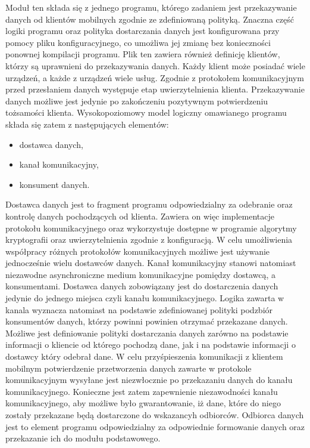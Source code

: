 Moduł ten składa się z jednego programu, którego zadaniem jest
przekazywanie danych od klientów mobilnych zgodnie ze zdefiniowaną
polityką. Znaczna część logiki programu oraz polityka dostarczania
danych jest konfigurowana przy pomocy pliku konfiguracyjnego, co
umożliwa jej zmianę bez konieczności ponownej kompilacji
programu. Plik ten zawiera również definicję klientów, którzy są
uprawnieni do przekazywania danych. Każdy klient może posiadać wiele
urządzeń, a każde z urządzeń wiele usług. Zgodnie z protokołem
komunikacyjnym przed przesłaniem danych występuje etap
uwierzytelnienia klienta. Przekazywanie danych możliwe jest jedynie po
zakończeniu pozytywnym potwierdzeniu tożsamości
klienta. Wysokopoziomowy model logiczny omawianego programu składa się zatem z
następujących elementów:

\begin{itemize}
\item dostawca danych,
\item kanał komunikacyjny,
\item konsument danych.
\end{itemize}

Dostawca danych jest to fragment programu odpowiedzialny za odebranie
oraz kontrolę danych pochodzących od klienta. Zawiera on więc
implementacje protokołu komunikacyjnego oraz wykorzystuje dostępne w
programie algorytmy kryptografii oraz uwierzytelnienia zgodnie z
konfiguracją. W celu umożliwienia współpracy różnych protokołów
komunikacyjnych możliwe jest używanie jednocześnie wielu dostawców
danych. Kanał komunikacyjny stanowi natomiast niezawodne
asynchroniczne medium komunikacyjne pomiędzy dostawcą, a
konsumentami. Dostawca danych zobowiązany jest do dostarczenia danych
jedynie do jednego miejsca czyli kanału komunikacyjnego. Logika
zawarta w kanala wyznacza natomiast na podstawie zdefiniowanej
polityki podzbiór konsumentów danych, którzy powinni powinien otrzymać
przekazane danych. Możliwe jest definiowanie polityki dostarczania
danych zarówno na podstawie informacji o kliencie od którego pochodzą
dane, jak i na podstawie informacji o dostawcy który odebrał dane. W
celu przyśpieszenia komunikacji z klientem mobilnym potwierdzenie
przetworzenia danych zawarte w protokole komunikacyjnym wysyłane jest
niezwłocznie po przekazaniu danych do kanału
komunikacyjnego. Konieczne jest zatem zapewnienie niezawodności kanału
komunikacyjnego, aby możliwe było gwarantowanie, iż dane, które do
niego zostały przekazane będą dostarczone do wskazancyh
odbiorców. Odbiorca danych jest to element programu odpowiedzialny za
odpowiednie formowanie danych oraz przekazanie ich do modułu
podstawowego.

